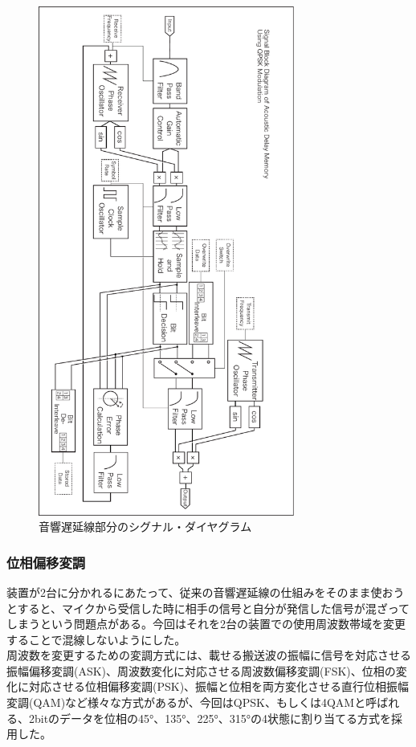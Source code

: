 \documentclass[a4paper,report]{jsbook}
\begin{document}
\begin{no-prefix-figure-caption}

\begin{figure}[htbp]
\centering
\includegraphics[width=0.75000\textwidth]{./img/adm2_diagram.pdf}
\caption{音響遅延線部分のシグナル・ダイヤグラム}
\end{figure}

\end{no-prefix-figure-caption}

\subsubsection{位相偏移変調}\label{ux4f4dux76f8ux504fux79fbux5909ux8abf}

装置が2台に分かれるにあたって、従来の音響遅延線の仕組みをそのまま使おうとすると、マイクから受信した時に相手の信号と自分が発信した信号が混ざってしまうという問題点がある。今回はそれを2台の装置での使用周波数帯域を変更することで混線しないようにした。\\
周波数を変更するための変調方式には、載せる搬送波の振幅に信号を対応させる振幅偏移変調(ASK)、周波数変化に対応させる周波数偏移変調(FSK)、位相の変化に対応させる位相偏移変調(PSK)、振幅と位相を両方変化させる直行位相振幅変調(QAM)など様々な方式があるが、今回はQPSK、もしくは4QAMと呼ばれる、2bitのデータを位相の45°、135°、225°、315°の4状態に割り当てる方式を採用した。
\end{document}
